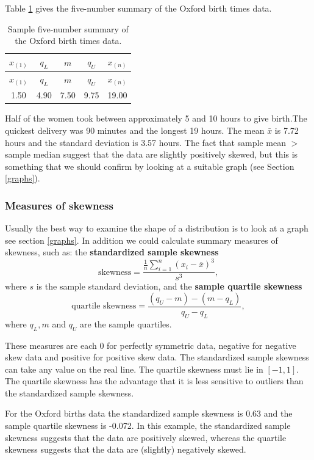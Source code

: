 \documentclass[
  11pt,
  british,
  openany, a4paper]{book}
\begin{document}
Table \ref{tab:oxfivenum} gives the five-number summary of the Oxford birth times data.

\begin{longtable}[]{@{}ccccc@{}}
\caption{\label{tab:oxfivenum} Sample five-number summary of the Oxford birth times data.}\tabularnewline
\toprule
\(x_{(1)}\) & \(q_L\) & \(m\) & \(q_U\) & \(x_{(n)}\)\tabularnewline
\midrule
\endfirsthead
\toprule
\(x_{(1)}\) & \(q_L\) & \(m\) & \(q_U\) & \(x_{(n)}\)\tabularnewline
\midrule
\endhead
1.50 & 4.90 & 7.50 & 9.75 & 19.00\tabularnewline
\bottomrule
\end{longtable}

Half of the women took between approximately 5 and 10 hours to give birth.The quickest delivery was 90 minutes and the longest 19 hours. The mean \(\bar{x}\) is 7.72 hours and the standard deviation is 3.57 hours. The fact that sample mean \(>\) sample median suggest that the data are slightly positively skewed, but this is something that we should confirm by looking at a suitable graph (see Section \ref{graphs}).

\hypertarget{measures-of-skewness}{%
\subsubsection*{Measures of skewness}\label{measures-of-skewness}}

Usually the best way to examine the shape of a distribution is to look at a graph see section \ref{graphs}. In addition we could calculate summary measures of skewness, such as: the \textbf{standardized sample skewness}
\[\mbox{skewness} = \frac{\displaystyle\frac1n \sum_{i=1}^n (x_i-
\overline{x})^3}{s^3}, \]
where \(s\) is the sample standard deviation, and the \textbf{sample quartile
skewness}
\[\mbox{quartile skewness} = \frac{(q_U-m)-(m-q_L)}{q_U-q_L}, \]
where \(q_L, m\) and \(q_U\) are the sample quartiles.

These measures are each 0 for perfectly symmetric data, negative for negative skew data and positive for positive skew data. The standardized sample skewness can take any value on the real line. The quartile skewness must lie in \([-1, 1]\). The quartile skewness has the advantage that it is less sensitive to outliers than the standardized sample skewness.

For the Oxford births data the standardized sample skewness is 0.63 and the sample quartile skewness is -0.072. In this example, the standardized sample skewness suggests that the data are positively skewed, whereas the quartile skewness suggests that the data are (slightly) negatively skewed.
\end{document}
